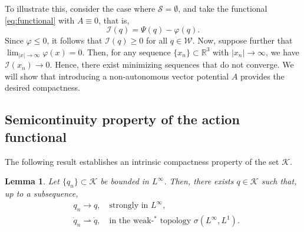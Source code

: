 \documentclass{article}
\newcommand{\boK}{\mathcal{K}}
\newcommand{\boI}{\mathcal{I}}
\newcommand{\boW}{\mathcal{W}}
\newcommand{\boS}{\mathcal{S}}
\newtheorem{lemma}{Lemma}[section]
\theoremstyle{definition}
\begin{document}
To illustrate this, consider the case where $\boS = \emptyset$, and take the functional \eqref{eq:functional} with $A \equiv 0$, that is,
\[
\boI(q) = \Psi(q) - \varphi(q).
\]
Since $\varphi \leq 0$, it follows that $\boI(q) \geq 0$ for all $q \in \boW$. Now, suppose further that $\lim_{|x| \to \infty} \varphi(x) = 0$. Then, for any sequence $\{x_n\} \subset \mathbb{R}^3$ with $|x_n| \to \infty$, we have $\boI(x_n) \to 0$. Hence, there exist minimizing sequences that do not converge. We will show that introducing a non-autonomous vector potential $A$ provides the desired compactness.


\subsection{Semicontinuity property of the action functional}

The following result establishes an intrinsic compactness property of the set $\boK$. 
\begin{lemma}\label{lemma:compactness}
    Let $\{q_n\}\subset\boK$ be bounded in $L^\infty$. Then, there exists $q\in\boK$ such that, up to a subsequence,
    \begin{align}
        &q_n\to q,\quad\text{strongly in }L^\infty,\label{eq:Linftyconv}
        \\
        &\dot{q}_n\rightharpoonup \dot{q},\quad\text{in the weak-$^*$ topology }\sigma(L^\infty,L^1).\label{eq:weak*conv}
    \end{align}
\end{lemma}
\end{document}
